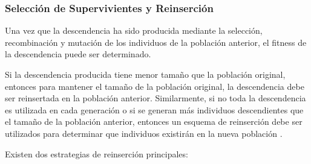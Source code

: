 \subsubsection{Selección de Supervivientes y Reinserción}
Una vez que la descendencia ha sido producida mediante la selección, recombinación y mutación de los individuos de la población anterior, el fitness de la descendencia puede ser determinado. 

Si la descendencia producida tiene menor tamaño que la población original, entonces para mantener el tamaño de la población original, la descendencia debe ser reinsertada en la población anterior. Similarmente, si no toda la descendencia es utilizada en cada generación o si se generan más individuos descendientes que el tamaño de la población anterior, entonces un esquema de reinserción debe ser utilizados para determinar que individuos existirán en la nueva población \cite{geatbx}.

Existen dos estrategias de reinserción principales:

